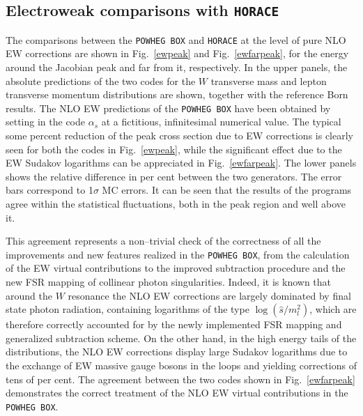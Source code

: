 \documentclass[11pt,a4paper]{article}
\newcommand\POWHEGBOX{\texttt{POWHEG BOX}}
\begin{document}
\subsection{Electroweak comparisons with \texttt{HORACE}}

The comparisons between the \POWHEGBOX{} and \texttt{HORACE} at the level of pure NLO EW corrections are shown in Fig.~\ref{ewpeak} and 
Fig.~\ref{ewfarpeak}, for the energy around the Jacobian peak and far from it, respectively. In the upper panels, the 
absolute predictions of the 
two codes for the $W$ transverse mass and lepton transverse momentum distributions are shown, together with the reference Born results.
The NLO EW predictions of the  \POWHEGBOX{}  have been obtained by setting in the code $\alpha_s$ at a fictitious, infinitesimal 
numerical value.
The typical some percent reduction of the peak cross section due to EW corrections is clearly seen for both the codes 
in Fig.~\ref{ewpeak}, while the significant effect due to the EW Sudakov logarithms can be appreciated in 
Fig.~\ref{ewfarpeak}. The lower panels shows the relative difference in per cent between the two generators. The error bars correspond to 1$\sigma$ MC 
errors. It can be seen that the results of the programs agree within the statistical fluctuations, both in the peak region and well above it.

This agreement represents a non--trivial check of the correctness of all the improvements and new features realized 
in the \POWHEGBOX{}, from the calculation of the EW virtual contributions to the improved subtraction procedure and the new FSR mapping 
of collinear photon singularities. 
Indeed, it is known that around the $W$ resonance the NLO EW corrections are largely dominated by 
final state photon radiation, containing
logarithms of the type $\log(\hat{s}/m_l^2)$, which are therefore correctly accounted for by the newly implemented FSR mapping
and generalized subtraction scheme.
On the other hand, in the high energy tails of the distributions, the NLO EW corrections display large Sudakov logarithms 
due to the
exchange of EW massive gauge bosons in the loops and yielding corrections of tens of per cent. The 
agreement between the two codes shown in Fig.~\ref{ewfarpeak} demonstrates the correct treatment of the NLO EW virtual contributions 
in the \POWHEGBOX{}.
\end{document}
